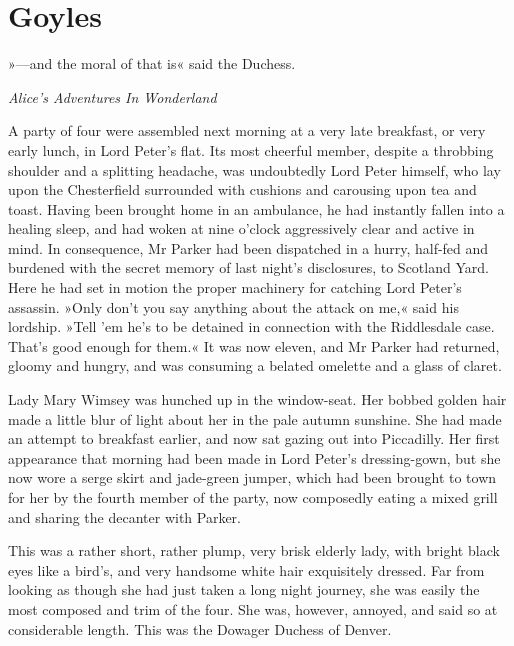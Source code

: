 

\chapter{Goyles}

\epigraph{»---and the moral of that is\longdash« said the Duchess.}{\textit{Alice's Adventures In Wonderland}}

\lettrine[lines=4]{A}{} party of four were assembled next morning at a very late breakfast, or very early lunch, in Lord Peter's flat. Its most cheerful member, despite a throbbing shoulder and a splitting headache, was undoubtedly Lord Peter himself, who lay upon the Chesterfield surrounded with cushions and carousing upon tea and toast. Having been brought home in an ambulance, he had instantly fallen into a healing sleep, and had woken at nine o'clock aggressively clear and active in mind. In consequence, Mr Parker had been dispatched in a hurry, half-fed and burdened with the secret memory of last night's disclosures, to Scotland Yard. Here he had set in motion the proper machinery for catching Lord Peter's assassin. »Only don't you say anything about the attack on me,« said his lordship. »Tell 'em he's to be detained in connection with the Riddlesdale case. That's good enough for them.« It was now eleven, and Mr Parker had returned, gloomy and hungry, and was consuming a belated omelette and a glass of claret.

Lady Mary Wimsey was hunched up in the window-seat. Her bobbed golden hair made a little blur of light about her in the pale autumn sunshine.  She had made an attempt to breakfast earlier, and now sat gazing out into Piccadilly. Her first appearance that morning had been made in Lord Peter's dressing-gown, but she now wore a serge skirt and jade-green jumper, which had been brought to town for her by the fourth member of the party, now composedly eating a mixed grill and sharing the decanter with Parker.

This was a rather short, rather plump, very brisk elderly lady, with bright black eyes like a bird's, and very handsome white hair exquisitely dressed. Far from looking as though she had just taken a long night journey, she was easily the most composed and trim of the four. She was, however, annoyed, and said so at considerable length.  This was the Dowager Duchess of Denver.


